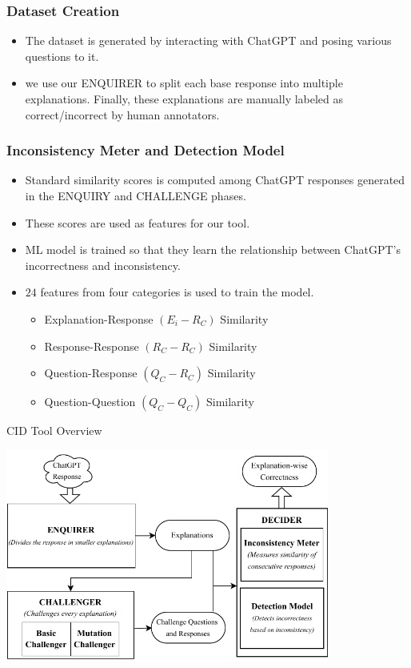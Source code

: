 \begin{frame}
    \frametitle{Dataset Creation}
    \begin{itemize}
        \item \footnotesize{The dataset is generated by interacting with ChatGPT and posing various questions to it.}
        \pause
        \item \footnotesize{we use our ENQUIRER to split each base response into multiple
explanations. Finally, these explanations are manually labeled
as correct/incorrect by human annotators.} 
    \end{itemize}
\end{frame}

\begin{frame}
    \frametitle{Inconsistency Meter and Detection Model}
    \begin{itemize}
        \item \footnotesize{Standard similarity scores is computed among ChatGPT responses generated
in the ENQUIRY and CHALLENGE phases.}
        \pause
        \item \footnotesize{These scores are used as features
for our tool.} 
        \pause 
        \item \footnotesize{ML model is trained so that they learn the relationship between ChatGPT's incorrectness and inconsistency.} 
        \pause 
        \item \footnotesize{$24$ features from four categories is used to train the model.} 
        \begin{itemize}
            \item \footnotesize{Explanation-Response $(E_{i}-R_{C})$ Similarity}
            \item \footnotesize{Response-Response $(R_{C}-R_{C})$ Similarity}
            \item \footnotesize{Question-Response $(Q_{C}-R_{C})$ Similarity}
            \item \footnotesize{Question-Question $(Q_{C}-Q_{C})$ Similarity}
        \end{itemize}
    \end{itemize}
\end{frame}

\begin{frame}{CID Tool Overview}
    \begin{center}
        \includegraphics[width=0.8\textwidth]{modules/nafees/CID_tool_overview.pdf}
    \end{center}
\end{frame}